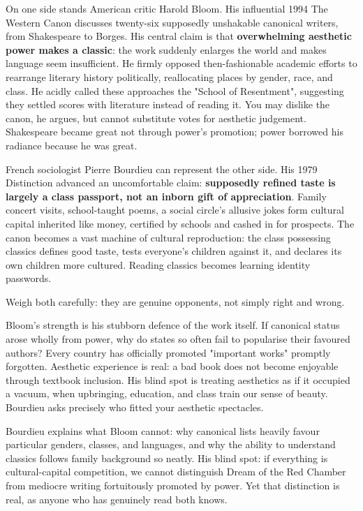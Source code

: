 On one side stands American critic Harold Bloom. His influential 1994 The Western Canon discusses twenty-six supposedly unshakable canonical writers, from Shakespeare to Borges. His central claim is that \textbf{overwhelming aesthetic power makes a classic}: the work suddenly enlarges the world and makes language seem insufficient. He firmly opposed then-fashionable academic efforts to rearrange literary history politically, reallocating places by gender, race, and class. He acidly called these approaches the "School of Resentment", suggesting they settled scores with literature instead of reading it. You may dislike the canon, he argues, but cannot substitute votes for aesthetic judgement. Shakespeare became great not through power's promotion; power borrowed his radiance because he was great.

French sociologist Pierre Bourdieu can represent the other side. His 1979 Distinction advanced an uncomfortable claim: \textbf{supposedly refined taste is largely a class passport, not an inborn gift of appreciation}. Family concert visits, school-taught poems, a social circle's allusive jokes form cultural capital inherited like money, certified by schools and cashed in for prospects. The canon becomes a vast machine of cultural reproduction: the class possessing classics defines good taste, tests everyone's children against it, and declares its own children more cultured. Reading classics becomes learning identity passwords.

Weigh both carefully: they are genuine opponents, not simply right and wrong.

Bloom's strength is his stubborn defence of the work itself. If canonical status arose wholly from power, why do states so often fail to popularise their favoured authors? Every country has officially promoted "important works" promptly forgotten. Aesthetic experience is real: a bad book does not become enjoyable through textbook inclusion. His blind spot is treating aesthetics as if it occupied a vacuum, when upbringing, education, and class train our sense of beauty. Bourdieu asks precisely who fitted your aesthetic spectacles.

Bourdieu explains what Bloom cannot: why canonical lists heavily favour particular genders, classes, and languages, and why the ability to understand classics follows family background so neatly. His blind spot: if everything is cultural-capital competition, we cannot distinguish Dream of the Red Chamber from mediocre writing fortuitously promoted by power. Yet that distinction is real, as anyone who has genuinely read both knows.

